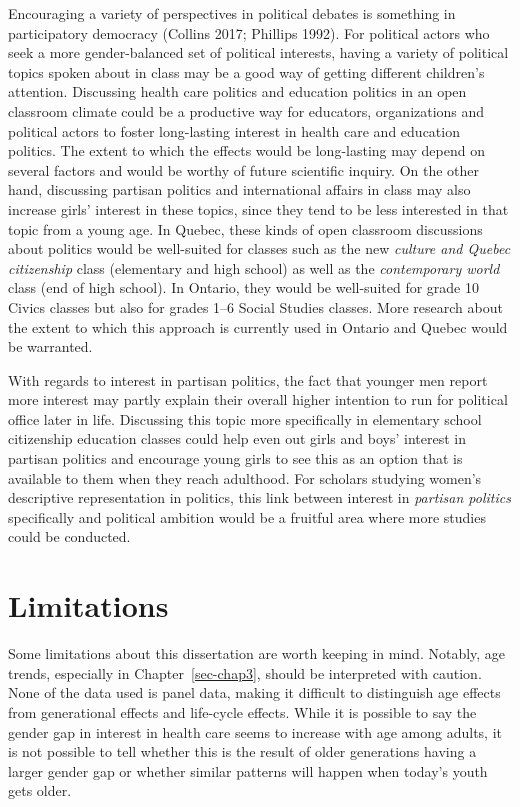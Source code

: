\documentclass[
  letterpaper,
  DIV=11,
  numbers=noendperiod]{scrreprt}
\begin{document}
Encouraging a variety of perspectives in political debates is something
in participatory democracy (Collins 2017; Phillips 1992). For political
actors who seek a more gender-balanced set of political interests,
having a variety of political topics spoken about in class may be a good
way of getting different children's attention. Discussing health care
politics and education politics in an open classroom climate could be a
productive way for educators, organizations and political actors to
foster long-lasting interest in health care and education politics. The
extent to which the effects would be long-lasting may depend on several
factors and would be worthy of future scientific inquiry. On the other
hand, discussing partisan politics and international affairs in class
may also increase girls' interest in these topics, since they tend to be
less interested in that topic from a young age. In Quebec, these kinds
of open classroom discussions about politics would be well-suited for
classes such as the new \emph{culture and Quebec citizenship} class
(elementary and high school) as well as the \emph{contemporary world}
class (end of high school). In Ontario, they would be well-suited for
grade 10 Civics classes but also for grades 1--6 Social Studies classes.
More research about the extent to which this approach is currently used
in Ontario and Quebec would be warranted.

With regards to interest in partisan politics, the fact that younger men
report more interest may partly explain their overall higher intention
to run for political office later in life. Discussing this topic more
specifically in elementary school citizenship education classes could
help even out girls and boys' interest in partisan politics and
encourage young girls to see this as an option that is available to them
when they reach adulthood. For scholars studying women's descriptive
representation in politics, this link between interest in \emph{partisan
politics} specifically and political ambition would be a fruitful area
where more studies could be conducted.

\section{Limitations}\label{limitations}

Some limitations about this dissertation are worth keeping in mind.
Notably, age trends, especially in Chapter~\ref{sec-chap3}, should be
interpreted with caution. None of the data used is panel data, making it
difficult to distinguish age effects from generational effects and
life-cycle effects. While it is possible to say the gender gap in
interest in health care seems to increase with age among adults, it is
not possible to tell whether this is the result of older generations
having a larger gender gap or whether similar patterns will happen when
today's youth gets older.
\end{document}
